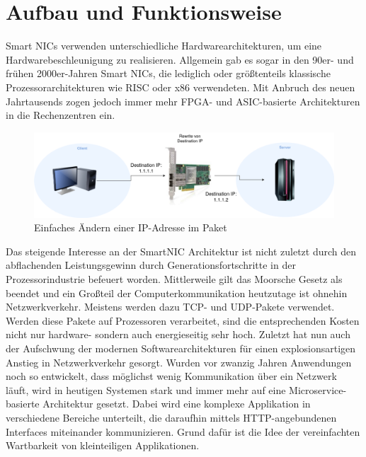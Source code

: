 \section{Aufbau und Funktionsweise}
Smart NICs verwenden unterschiedliche Hardwarearchitekturen, um eine Hardwarebeschleunigung zu realisieren. Allgemein gab es sogar in den 90er- und frühen 2000er-Jahren Smart NICs, die lediglich oder größtenteils klassische Prozessorarchitekturen wie RISC oder x86 verwendeten. Mit Anbruch des neuen Jahrtausends zogen jedoch immer mehr FPGA- und ASIC-basierte Architekturen in die Rechenzentren ein. \cite{towardsSmartNICCluster}
\begin{figure}
    \centering
    \includegraphics[width=1\linewidth]{images/GrundaufbauSmartNIC.drawio.png}
    \caption{Einfaches Ändern einer IP-Adresse im Paket}
    \label{fig:enter-label}
\end{figure}
Das steigende Interesse an der SmartNIC Architektur ist nicht zuletzt durch den abflachenden Leistungsgewinn durch Generationsfortschritte in der Prozessorindustrie befeuert worden. Mittlerweile gilt das Moorsche Gesetz als beendet und ein Großteil der Computerkommunikation heutzutage ist ohnehin Netzwerkverkehr. \cite{endofmoore} Meistens werden dazu TCP- und UDP-Pakete verwendet. Werden diese Pakete auf Prozessoren verarbeitet, sind die entsprechenden Kosten nicht nur hardware- sondern auch energieseitig sehr hoch. Zuletzt hat nun auch der Aufschwung der modernen Softwarearchitekturen für einen explosionsartigen Anstieg in Netzwerkverkehr gesorgt. Wurden vor zwanzig Jahren Anwendungen noch so entwickelt, dass möglichst wenig Kommunikation über ein Netzwerk läuft, wird in heutigen Systemen stark und immer mehr auf eine Microservice-basierte Architektur gesetzt. \cite{microservices} Dabei wird eine komplexe Applikation in verschiedene Bereiche unterteilt, die daraufhin mittels HTTP-angebundenen Interfaces miteinander kommunizieren. Grund dafür ist die Idee der vereinfachten Wartbarkeit von kleinteiligen Applikationen.
